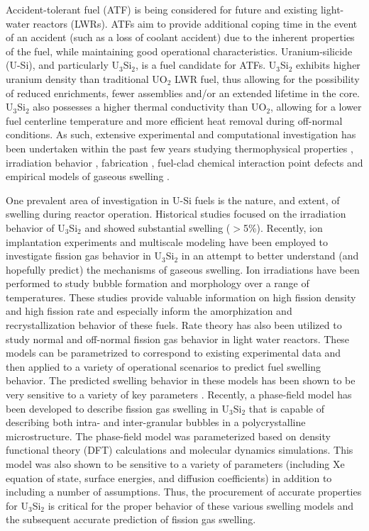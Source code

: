 \documentclass[review]{elsarticle}
\begin{document}
Accident-tolerant fuel (ATF) \cite{zinkle2014} is being considered for future and existing light-water reactors (LWRs). ATFs aim to provide additional coping time in the event of an accident (such as a loss of coolant accident) due to the inherent properties of the fuel, while maintaining good operational characteristics. Uranium-silicide (U-Si), and particularly U$_{3}$Si$_{2}$, is a fuel candidate for ATFs. U$_{3}$Si$_{2}$ exhibits higher uranium density than traditional UO$_{2}$ LWR fuel, thus allowing for the possibility of reduced enrichments, fewer assemblies and/or an extended lifetime in the core. U$_{3}$Si$_{2}$ also possesses a higher thermal conductivity than UO$_{2}$, allowing for a lower fuel centerline temperature and more efficient heat removal during off-normal conditions. As such, extensive experimental and computational investigation has been undertaken within the past few years studying thermophysical properties \cite{white2015}, irradiation behavior \cite{carmack2015, miao2017a, miao2018}, fabrication \cite{harp2015}, fuel-clad chemical interaction \cite{he2017} point defects \cite{middleburgh2016} and empirical models of gaseous swelling \cite{miao2017, miao2018a}. 

One prevalent area of investigation in U-Si fuels is the nature, and extent, of swelling during reactor operation. Historical studies \cite{shimizu1965} focused on the irradiation behavior of U$_3$Si$_2$ and showed substantial swelling ($>$5\%). Recently, ion implantation experiments and multiscale modeling have been employed to investigate fission gas behavior in U$_3$Si$_2$ in an attempt to better understand (and hopefully predict) the mechanisms of gaseous swelling. Ion irradiations \cite{miao2017a, miao2018, yao2018} have been performed to study bubble formation and morphology over a range of temperatures. These studies provide valuable information on high fission density and high fission rate and especially inform the amorphization and recrystallization behavior of these fuels. Rate theory has also been utilized \cite{miao2017, miao2018a} to study normal and off-normal fission gas behavior in light water reactors. These models can be parametrized to correspond to existing experimental data and then applied to a variety of operational scenarios to predict fuel swelling behavior. The predicted swelling behavior in these models has been shown to be very sensitive to a variety of key parameters \cite{miao2017}. Recently, a phase-field model has been developed to describe fission gas swelling in U$_{3}$Si$_{2}$ \cite{fy17usi, fy18usi} that is capable of describing both intra- and inter-granular bubbles in a polycrystalline microstructure. The phase-field model was parameterized based on density functional theory (DFT) calculations and molecular dynamics simulations. This model was also shown to be sensitive to a variety of parameters (including Xe equation of state, surface energies, and diffusion coefficients) in addition to including a number of assumptions. Thus, the procurement of accurate properties for U$_3$Si$_2$ is critical for the proper behavior of these various swelling models and the subsequent accurate prediction of fission gas swelling. 
\end{document}

